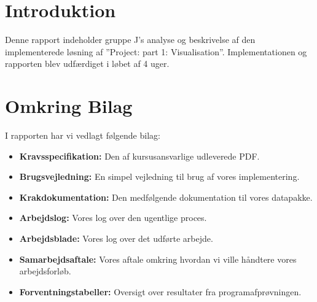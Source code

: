 \section{Introduktion}
Denne rapport indeholder gruppe J's analyse og beskrivelse af den implementerede løsning af ''Project: part 1: Visualisation''. Implementationen og rapporten blev udfærdiget i løbet af 4 uger.
\section{Omkring Bilag}
I rapporten har vi vedlagt følgende bilag:
\begin{itemize}
	\item \textbf{Kravsspecifikation:} Den af kursusansvarlige udleverede PDF.
	\item \textbf{Brugsvejledning:} En simpel vejledning til brug af vores implementering.
	\item \textbf{Krakdokumentation:} Den medfølgende dokumentation til vores datapakke.
	\item \textbf{Arbejdslog:} Vores log over den ugentlige proces.
	\item \textbf{Arbejdsblade:} Vores log over det udførte arbejde.
	\item \textbf{Samarbejdsaftale:} Vores aftale omkring hvordan vi ville håndtere vores arbejdsforløb.
	\item \textbf{Forventningstabeller:} Oversigt over resultater fra programafprøvningen.
\end{itemize}

